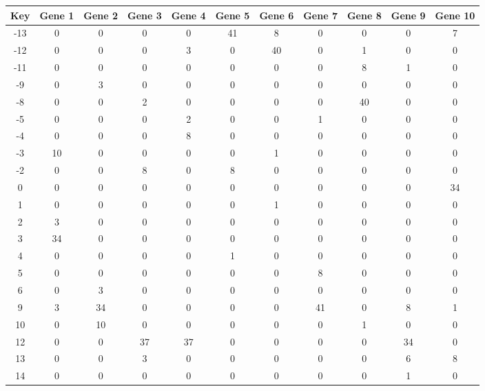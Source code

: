 \begin{tabular}{|c|c|c|c|c|c|c|c|c|c|c|}
\hline
Key & Gene 1 & Gene 2 & Gene 3 & Gene 4 & Gene 5 & Gene 6 & Gene 7 & Gene 8 & Gene 9 & Gene 10 \\
\hline
-13 & 0 & 0 & 0 & 0 & 41 & 8 & 0 & 0 & 0 & 7 \\
-12 & 0 & 0 & 0 & 3 & 0 & 40 & 0 & 1 & 0 & 0 \\
-11 & 0 & 0 & 0 & 0 & 0 & 0 & 0 & 8 & 1 & 0 \\
-9 & 0 & 3 & 0 & 0 & 0 & 0 & 0 & 0 & 0 & 0 \\
-8 & 0 & 0 & 2 & 0 & 0 & 0 & 0 & 40 & 0 & 0 \\
-5 & 0 & 0 & 0 & 2 & 0 & 0 & 1 & 0 & 0 & 0 \\
-4 & 0 & 0 & 0 & 8 & 0 & 0 & 0 & 0 & 0 & 0 \\
-3 & 10 & 0 & 0 & 0 & 0 & 1 & 0 & 0 & 0 & 0 \\
-2 & 0 & 0 & 8 & 0 & 8 & 0 & 0 & 0 & 0 & 0 \\
0 & 0 & 0 & 0 & 0 & 0 & 0 & 0 & 0 & 0 & 34 \\
1 & 0 & 0 & 0 & 0 & 0 & 1 & 0 & 0 & 0 & 0 \\
2 & 3 & 0 & 0 & 0 & 0 & 0 & 0 & 0 & 0 & 0 \\
3 & 34 & 0 & 0 & 0 & 0 & 0 & 0 & 0 & 0 & 0 \\
4 & 0 & 0 & 0 & 0 & 1 & 0 & 0 & 0 & 0 & 0 \\
5 & 0 & 0 & 0 & 0 & 0 & 0 & 8 & 0 & 0 & 0 \\
6 & 0 & 3 & 0 & 0 & 0 & 0 & 0 & 0 & 0 & 0 \\
9 & 3 & 34 & 0 & 0 & 0 & 0 & 41 & 0 & 8 & 1 \\
10 & 0 & 10 & 0 & 0 & 0 & 0 & 0 & 1 & 0 & 0 \\
12 & 0 & 0 & 37 & 37 & 0 & 0 & 0 & 0 & 34 & 0 \\
13 & 0 & 0 & 3 & 0 & 0 & 0 & 0 & 0 & 6 & 8 \\
14 & 0 & 0 & 0 & 0 & 0 & 0 & 0 & 0 & 1 & 0 \\
\hline
\end{tabular}